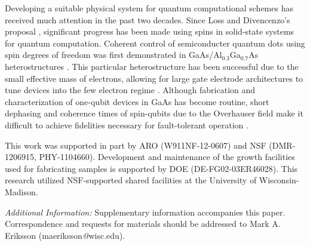 \documentclass[reprint,aps,pra,superscriptaddress,notitlepage]{revtex4-1}
\begin{document}
Developing a suitable physical system for quantum computational schemes has received much attention in the past two decades. Since Loss and Divencenzo's proposal \cite{Loss:1998p120}, significant progress has been made using spins in solid-state systems for quantum computation. Coherent control of semiconducter quantum dots using spin degrees of freedom was first demonstrated in GaAs/Al$_{0.3}$Ga$_{0.7}$As heterostructures \cite{Petta:2005p2180, Koppens:2006p766}. This particular heterostructure has been successful due to the small effective mass of electrons, allowing for large gate electrode architectures to tune devices into the few electron regime \cite{Ciorga:2000p16315}. Although fabrication and characterization of one-qubit devices in GaAs has become routine, \cite{Petta:2005p2180, Koppens:2006p766, Petta:2004p1586, PioroLadriere:2008p776, Laird:2010p1985} short dephasing and coherence times of spin-qubits due to the Overhauser field \cite{Coish:2004p5340} make it difficult to achieve fidelities necessary for fault-tolerant operation \cite{Fowler:2012p032324}.


\begin{acknowledgments}
This work was supported in part by ARO (W911NF-12-0607) and NSF (DMR-1206915, PHY-1104660). Development and maintenance of the growth facilities used for fabricating samples is supported by DOE (DE-FG02-03ER46028). This research utilized NSF-supported shared facilities at the University of Wisconsin-Madison.
\end{acknowledgments}




\emph{Additional Information:}
Supplementary information accompanies this paper. Correspondence and requests for materials should be addressed to Mark A. Eriksson (maeriksson\emph{@}wisc.edu).
\end{document}
